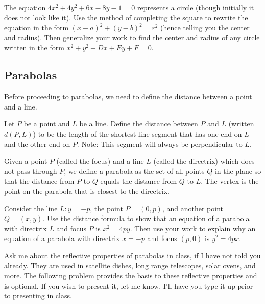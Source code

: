 \begin{problem} 
The equation $4x^2+4y^2+6x-8y-1=0$ represents a circle (though initially it does not look like it). Use the method of completing the square to rewrite the equation in the form
$(x-a)^2 + (y-b)^2 = r^2$ (hence telling you the center and radius). Then generalize
your work to find the center and radius of any circle written in the form $x^2+y^2+Dx+Ey+F=0$.
\end{problem}

\subsection{Parabolas}
Before proceeding to parabolas, we need to define the distance between a point and a line.

\begin{definition}
Let $P$ be a point and $L$ be a line.  Define the distance between $P$ and $L$ (written
$d(P,L)$) to be the length of the shortest line segment that has one end on $L$ and the other end on $P$. Note: This segment will always be perpendicular to $L$.
\end{definition}

\begin{definition}
Given a point $P$ (called the focus) and a line $L$ (called the directrix) which does not pass through $P$, we define a parabola as the set of all points $Q$ in the plane so that the distance from $P$ to $Q$ equals the distance from $Q$ to $L$. 
The vertex is the point on the parabola that is closest to the directrix.
\end{definition}

\begin{problem}  
%
Consider the line $L:y=-p$, the point $P=(0,p)$, and another point $Q=(x,y)$.  Use the distance formula to show that an equation of a parabola with directrix $L$ and focus $P$ is $x^2=4py$.
Then use your work to explain why an equation of a parabola with directrix $x=-p$ and focus $(p,0)$ is $y^2=4px$. 
\end{problem}

Ask me about the reflective properties of parabolas in class, if I have not told you already.  They are used in satellite dishes, long range telescopes, solar ovens, and more.  The following problem provides the basis to these reflective properties and is optional.  If you wish to present it, let me know. I'll have you type it up prior to presenting in class.

